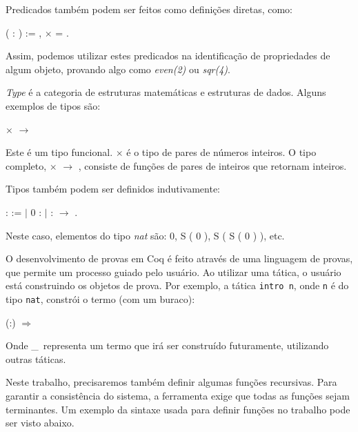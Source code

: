 Predicados também podem ser feitos como definições diretas, como:

\bigskip
{}  ( : ) :=
\coqdoctac{\ensuremath{\exists}} , 
\ensuremath{\times}  = .\coqdoceol
\bigskip

Assim, podemos utilizar estes predicados na identificação de  propriedades de
algum objeto, provando algo como \emph{even(2)} ou \emph{sqr(4)}.

\emph{Type} é a categoria de estruturas matemáticas e estruturas de dados.
Alguns exemplos de tipos são:

\bigskip
{} \ensuremath{\times} 
\ensuremath{\rightarrow} 
\bigskip

Este é um tipo funcional.   \ensuremath{\times}
 é o tipo de pares de números inteiros. O tipo completo,
 \ensuremath{\times} 
\ensuremath{\rightarrow} , consiste de funções de pares
de inteiros que retornam inteiros.

Tipos também podem ser definidos indutivamente:

\bigskip
{}  :  :=\coqdoceol
\coqdocindent{2.00em} \ensuremath{|} 0 : \coqdoceol 
\coqdocindent{2.00em} \ensuremath{|}  :  \ensuremath{\rightarrow}
.\coqdoceol
\bigskip

Neste caso, elementos do tipo \emph{nat} são: 0, S ( 0 ), S ( S ( 0 ) ), etc.

O desenvolvimento de provas em Coq é feito através de uma linguagem de provas,
que permite um processo guiado pelo usuário. Ao utilizar uma tática, o usuário
está construindo os objetos de prova. Por exemplo, a tática
\texttt{intro n}, onde \texttt{n} é do tipo \texttt{nat}, constrói o termo (com um
buraco):

\bigskip
{} (:) \ensuremath{\Rightarrow} \coqdocvar{\_}\coqdoceol
\bigskip

Onde \_\ representa um termo que irá ser construído futuramente, utilizando
outras táticas. 

Neste trabalho, precisaremos também definir algumas funções recursivas. Para
garantir a consistência do sistema, a ferramenta exige que todas as funções
sejam terminantes. Um exemplo da sintaxe usada para definir funções no trabalho
pode ser visto abaixo.

